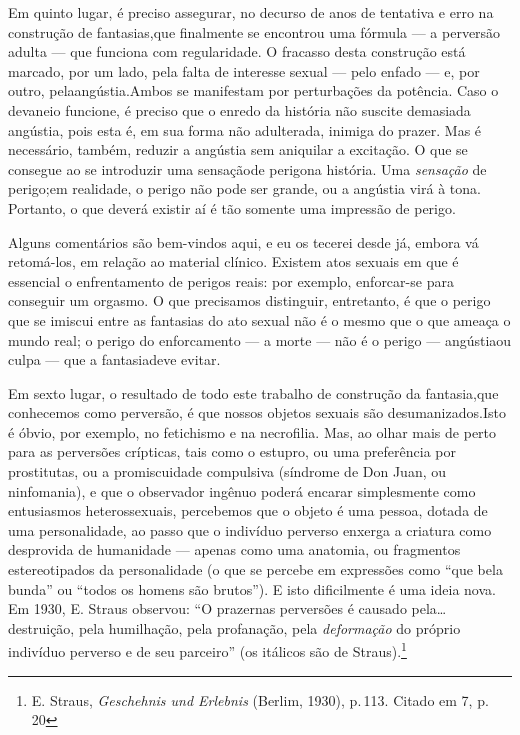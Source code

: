 Em quinto lugar, é preciso assegurar, no decurso de anos de
tentativa e erro na construção de fantasias,\idxfantacons[|(] que finalmente se
encontrou uma fórmula --- a perversão adulta --- que funciona com
regularidade. O fracasso desta construção está marcado, por um lado,
pela falta de interesse sexual --- pelo\idxpervenfad{} enfado\idxenfa{} --- e, por outro, pela\idxfantaangu[|(]
angústia.\idxangu[|(] Ambos se manifestam por perturbações da potência. Caso o
devaneio funcione, é preciso que o enredo da história não suscite
demasiada angústia, pois esta é, em sua forma não adulterada, inimiga
do prazer. Mas é necessário, também, reduzir a angústia sem aniquilar a
excitação. O que se consegue ao se introduzir uma sensação\idxperigo[|(] de perigo\idxfantaexpo[|(] na
história. Uma \textit{sensação} de perigo;\idxpervexpos[|(] em realidade, o perigo não
pode ser grande, ou a angústia virá à tona. Portanto, o que deverá
existir aí é tão somente uma impressão de perigo.

Alguns comentários são bem-vindos aqui, e eu os tecerei desde já,
embora vá retomá-los, em relação ao material clínico. Existem atos
sexuais em que é essencial o enfrentamento de perigos reais: por
exemplo, enforcar-se\idxenfor{} para conseguir um orgasmo. O que precisamos
distinguir, entretanto, é que o perigo que se imiscui entre as
fantasias do ato sexual não é o mesmo que o que \mbox{ameaça} o mundo real; o
perigo do enforcamento --- a morte --- não é o perigo --- angústia\idxfantaangu[|)] ou culpa ---
que a fantasia\idxangu[|)] deve evitar.\idxperigo[|)]

Em sexto lugar, o resultado de todo este trabalho de construção da
fantasia,\idxfanta[|)] que conhecemos como perversão, é que nossos objetos sexuais
são desumanizados.\idxdesufant[|(] Isto é óbvio, por exemplo, no fetichismo\idxfetic{} e na
necrofilia.\idxnecro{} Mas, ao olhar mais de perto para as perversões crípticas,
tais como o estupro,\idxestup{} ou uma preferência por prostitutas,\idxprost{} ou a
promiscuidade\idxpromiscomp{} compulsiva (síndrome de Don Juan,\idxdonj{} ou ninfomania), e que o
observador ingênuo poderá encarar simplesmente como entusiasmos
heterossexuais, percebemos que o objeto é uma pessoa, dotada de uma
personalidade, ao passo que o indivíduo perverso enxerga a criatura
como desprovida de humanidade --- apenas como uma anatomia, ou fragmentos
estereotipados da personalidade (o que se percebe em expressões como
``que bela bunda'' ou ``todos os homens são brutos''). E isto dificilmente é uma ideia
nova. Em 1930, E. Straus\idxstraus{} observou: ``O prazer\idxpraz[|(] nas
perversões é causado pela\ldots{} destruição, pela humilhação, pela
profanação, pela \textit{deformação} do próprio indivíduo perverso e de
seu parceiro'' (os itálicos são de Straus).\footnote{ E.
Straus, \textit{Geschehnis und Erlebnis} (Berlim, 1930), p.\,113. Citado
em 7, p.\,20}


